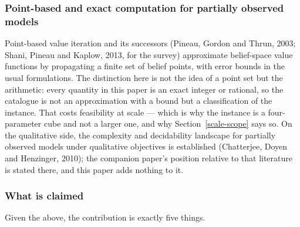 \documentclass[10pt,twocolumn]{article}
\theoremstyle{plain}
\theoremstyle{definition}
\theoremstyle{remark}
\begin{document}
\subsubsection{Point-based and exact computation for partially observed models}

Point-based value iteration and its successors (Pineau, Gordon and Thrun, 2003; Shani,
Pineau and Kaplow, 2013, for the survey) approximate belief-space value functions by
propagating a finite set of belief points, with error bounds in the usual formulations. The
distinction here is not the idea of a point set but the arithmetic: every quantity in this
paper is an exact integer or rational, so the catalogue is not an approximation with a
bound but a classification of the instance. That costs feasibility at scale --- which is why
the instance is a four-parameter cube and not a larger one, and why
Section~\ref{scale-scope} says so. On the qualitative side, the complexity and decidability
landscape for partially observed models under qualitative objectives is established
(Chatterjee, Doyen and Henzinger, 2010); the companion paper's position relative to that
literature is stated there, and this paper adds nothing to it.

\subsubsection{What is claimed}

Given the above, the contribution is exactly five things.
\end{document}
